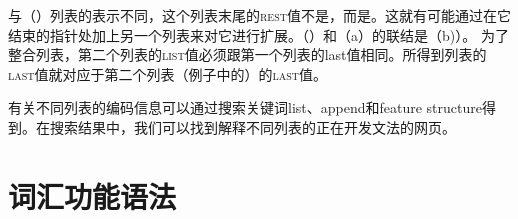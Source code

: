 \begin{enumerate}
与（）列表的表示不同，这个列表末尾的\textsc{rest}值不是，而是。这就有可能通过在它结束的指针处加上另一个列表来对它进行扩展。（）和（a）的联结是（b)）。
\eal
\ex 
{}
\ex
{}
\zl
为了整合列表，第二个列表的\textsc{list}值必须跟第一个列表的{\sc last}值相同。所得到列表的\textsc{last}值就对应于第二个列表（例子中的）的\textsc{last}值。

有关不同列表的编码信息可以通过搜索关键词list、append和feature structure得到。在搜索结果中，我们可以找到解释不同列表的正在开发文法的网页。
\end{enumerate}



\section{词汇功能语法}

